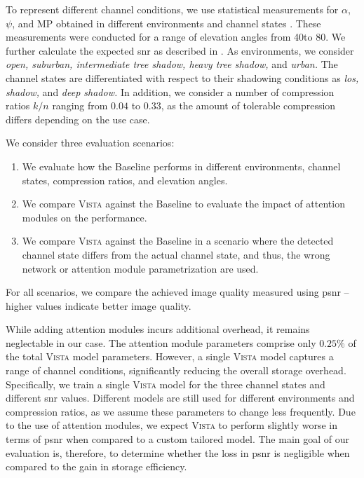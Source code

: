 \documentclass[conference]{IEEEtran}
\newcommand\MP{\ensuremath{\mathrm{MP}}\xspace}
\newcommand\ours{\textsc{Vista}\xspace}
\newcommand\baseline{Baseline\xspace}
\begin{document}
To represent different channel conditions, we use statistical measurements for $\alpha$, $\psi$, and \MP obtained in different environments and channel states \cite{channel-params}.
These measurements were conducted for a range of elevation angles from 40\textdegree to 80\textdegree.
We further calculate the expected \ac{snr} as described in .
As environments, we consider \emph{open, suburban, intermediate tree shadow, heavy tree shadow,} and \emph{urban.}
The channel states are differentiated with respect to their shadowing conditions as \emph{\acf{los}, shadow,} and \emph{deep shadow.}
In addition, we consider a number of compression ratios $k/n$ ranging from $0.04$ to $0.33$, as the amount of tolerable compression differs depending on the use case.

We consider three evaluation scenarios:
%
\begin{enumerate}
  \item We evaluate how the \baseline performs in different environments, channel states, compression ratios, and elevation angles.
  \item We compare \ours against the \baseline to evaluate the impact of attention modules on the performance.
  \item We compare \ours against the \baseline in a scenario where the detected channel state differs from the actual channel state, and thus, the wrong network or attention module parametrization are used.
\end{enumerate}

For all scenarios, we compare the achieved image quality measured using \ac{psnr} -- higher values indicate better image quality.

While adding attention modules incurs additional overhead, 
it remains neglectable in our case. 
The attention module parameters comprise only $0.25\%$ of the total \ours model parameters.  
However, a single \ours model captures a range of channel conditions, significantly reducing the overall storage overhead.
Specifically, we train a single \ours model for the three channel states and different \ac{snr} values.
Different models are still used for different environments and compression ratios, as we assume these parameters to change less frequently.
Due to the use of attention modules, we expect \ours to perform slightly worse in terms of \ac{psnr} when compared to a custom tailored model.
The main goal of our evaluation is, therefore, to determine whether the loss in \ac{psnr} is negligible when compared to the gain in storage efficiency.
\end{document}
